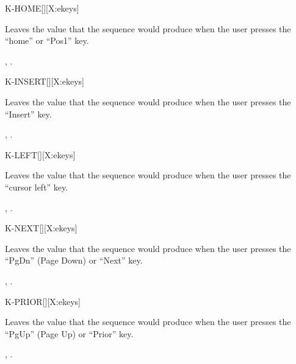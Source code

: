 \begin{worddef}{}{K-HOME}[][X:ekeys]
\item {}

	Leaves the value  that the sequence 
	 would produce when the user presses the
	``home'' or ``Pos1'' key.

\see {},
	.
\end{worddef}


\begin{worddef}{}{K-INSERT}[][X:ekeys]
\item {}

	Leaves the value  that the sequence 
	 would produce when the user presses the
	``Insert'' key.

\see {},
	.
\end{worddef}


\begin{worddef}{}{K-LEFT}[][X:ekeys]
\item {}

	Leaves the value  that the sequence 
	 would produce when the user presses the
	``cursor left'' key.

\see {},
	.
\end{worddef}


\begin{worddef}{}{K-NEXT}[][X:ekeys]
\item {}

	Leaves the value  that the sequence 
	 would produce when the user presses the
	``PgDn'' (Page Down) or ``Next'' key.

\see {},
	.
\end{worddef}


\begin{worddef}{}{K-PRIOR}[][X:ekeys]
\item {}

	Leaves the value  that the sequence 
	 would produce when the user presses the
	``PgUp'' (Page Up) or ``Prior'' key.

\see {},
	.
\end{worddef}



